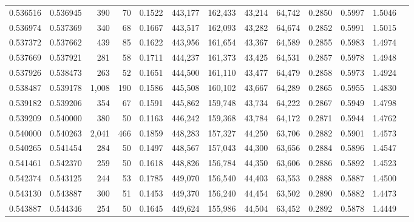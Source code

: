 \begin{tabular}{rrrrrrrrrrrrr}
0.536516 & 0.536945 &   390 &  70 &                                     0.1522 & 443,177 & 162,433 &  43,214 &  64,742 & 0.2850 & 0.5997 & 1.5046 \\
0.536974 & 0.537369 &   340 &  68 &                                     0.1667 & 443,517 & 162,093 &  43,282 &  64,674 & 0.2852 & 0.5991 & 1.5015 \\
0.537372 & 0.537662 &   439 &  85 &                                     0.1622 & 443,956 & 161,654 &  43,367 &  64,589 & 0.2855 & 0.5983 & 1.4974 \\
0.537669 & 0.537921 &   281 &  58 &                                     0.1711 & 444,237 & 161,373 &  43,425 &  64,531 & 0.2857 & 0.5978 & 1.4948 \\
0.537926 & 0.538473 &   263 &  52 &                                     0.1651 & 444,500 & 161,110 &  43,477 &  64,479 & 0.2858 & 0.5973 & 1.4924 \\
0.538487 & 0.539178 & 1,008 & 190 &                                     0.1586 & 445,508 & 160,102 &  43,667 &  64,289 & 0.2865 & 0.5955 & 1.4830 \\
0.539182 & 0.539206 &   354 &  67 &                                     0.1591 & 445,862 & 159,748 &  43,734 &  64,222 & 0.2867 & 0.5949 & 1.4798 \\
0.539209 & 0.540000 &   380 &  50 &                                     0.1163 & 446,242 & 159,368 &  43,784 &  64,172 & 0.2871 & 0.5944 & 1.4762 \\
0.540000 & 0.540263 & 2,041 & 466 &                                     0.1859 & 448,283 & 157,327 &  44,250 &  63,706 & 0.2882 & 0.5901 & 1.4573 \\
0.540265 & 0.541454 &   284 &  50 &                                     0.1497 & 448,567 & 157,043 &  44,300 &  63,656 & 0.2884 & 0.5896 & 1.4547 \\
0.541461 & 0.542370 &   259 &  50 &                                     0.1618 & 448,826 & 156,784 &  44,350 &  63,606 & 0.2886 & 0.5892 & 1.4523 \\
0.542374 & 0.543125 &   244 &  53 &                                     0.1785 & 449,070 & 156,540 &  44,403 &  63,553 & 0.2888 & 0.5887 & 1.4500 \\
0.543130 & 0.543887 &   300 &  51 &                                     0.1453 & 449,370 & 156,240 &  44,454 &  63,502 & 0.2890 & 0.5882 & 1.4473 \\
0.543887 & 0.544346 &   254 &  50 &                                     0.1645 & 449,624 & 155,986 &  44,504 &  63,452 & 0.2892 & 0.5878 & 1.4449 \\

\end{tabular}

